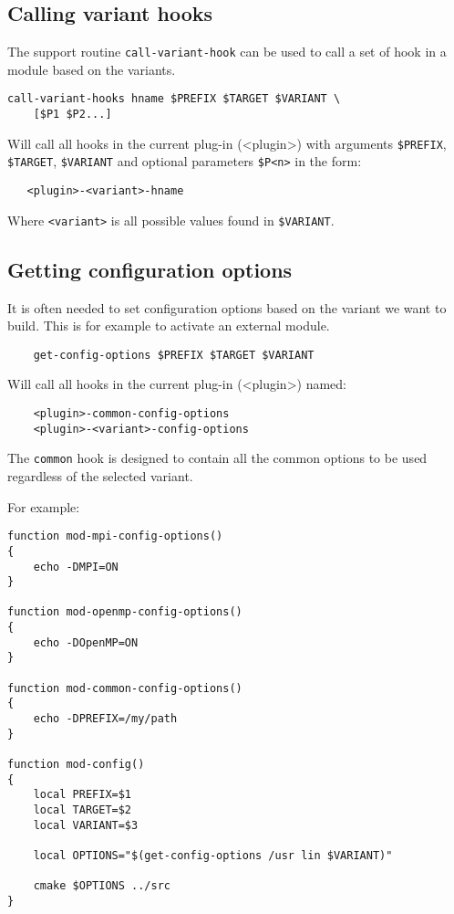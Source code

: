 \documentclass[a4paper,12pt,twoside]{article}
\newcommand{\code}[1]{\texttt{#1}}
\begin{document}
\subsection{Calling variant hooks}
\label{call variant hooks}

The support routine \code{call-variant-hook} can be used to call a set of hook in a module based on the variants.

\begin{lstlisting}
call-variant-hooks hname $PREFIX $TARGET $VARIANT \
    [$P1 $P2...]
\end{lstlisting}

Will call all hooks in the current plug-in (<plugin>) with arguments \code{\$PREFIX}, \code{\$TARGET}, \code{\$VARIANT} and optional parameters \code{\$P<n>} in the form:

\begin{lstlisting}
   <plugin>-<variant>-hname
\end{lstlisting}

Where \code{<variant>} is all possible values found in \code{\$VARIANT}.

\subsection{Getting configuration options}
\label{get config options}

It is often needed to set configuration options based on the variant we want to build. This is for example to activate an external module.

\begin{lstlisting}
	get-config-options $PREFIX $TARGET $VARIANT
\end{lstlisting}

Will call all hooks in the current plug-in (<plugin>) named:

\begin{lstlisting}
	<plugin>-common-config-options
	<plugin>-<variant>-config-options
\end{lstlisting}

The \code{common} hook is designed to contain all the common options to be used regardless of the selected variant.

For example:

\begin{lstlisting}
function mod-mpi-config-options()
{
	echo -DMPI=ON
}

function mod-openmp-config-options()
{
	echo -DOpenMP=ON
}

function mod-common-config-options()
{
	echo -DPREFIX=/my/path
}

function mod-config()
{
	local PREFIX=$1
	local TARGET=$2
	local VARIANT=$3

	local OPTIONS="$(get-config-options /usr lin $VARIANT)"

	cmake $OPTIONS ../src
}
\end{lstlisting}
\end{document}
